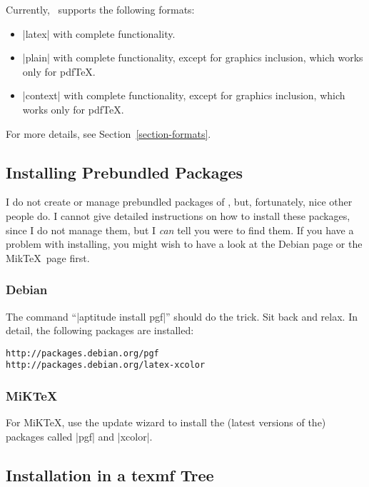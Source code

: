 Currently, \pgfname\ supports the following formats:
\begin{itemize}
\item
  |latex| with complete functionality.
\item
  |plain| with complete functionality, except for graphics inclusion,
  which works only for pdf\TeX.
\item
  |context| with complete functionality, except for graphics inclusion,
  which works only for pdf\TeX.
\end{itemize}

For more details, see Section~\ref{section-formats}.



\subsection{Installing Prebundled Packages}

I do not create or manage prebundled packages of \pgfname, but,
fortunately, nice other people do. I cannot give detailed instructions
on how to install these packages, since I do not manage them, but I
\emph{can} tell you were to find them. If you have a problem with
installing, you might wish to have a look at the Debian page or the
Mik\TeX\ page first.


\subsubsection{Debian}

The command ``|aptitude install pgf|'' should do the trick. Sit back
and relax. In detail, the following packages are installed:  
\begin{verbatim}
http://packages.debian.org/pgf
http://packages.debian.org/latex-xcolor
\end{verbatim}


\subsubsection{MiKTeX}

For MiK\TeX, use the update wizard to install the (latest versions of
the) packages called |pgf| and |xcolor|. 




\subsection{Installation in a texmf Tree}

